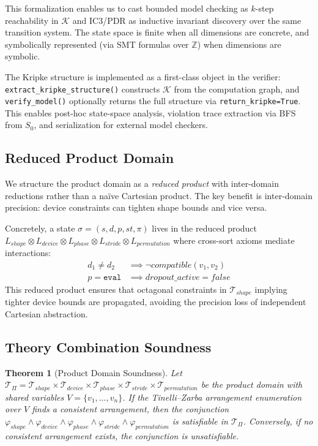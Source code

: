 \documentclass[11pt]{article}
\newtheorem{theorem}{Theorem}
\begin{document}
This formalization enables us to cast bounded model checking as
$k$-step reachability in $\mathcal{K}$ and IC3/PDR as inductive
invariant discovery over the same transition system.  The state
space is finite when all dimensions are concrete, and symbolically
represented (via SMT formulas over $\mathbb{Z}$) when dimensions
are symbolic.

The Kripke structure is implemented as a first-class object in the
verifier: \texttt{extract\_kripke\_structure()} constructs
$\mathcal{K}$ from the computation graph, and \texttt{verify\_model()}
optionally returns the full structure via \texttt{return\_kripke=True}.
This enables post-hoc state-space analysis, violation trace extraction
via BFS from $S_0$, and serialization for external model checkers.

\subsection{Reduced Product Domain}\label{sec:cofibered}

We structure the product domain
as a \emph{reduced product} with inter-domain reductions
rather than a na\"ive Cartesian
product.  The key benefit is inter-domain precision: device
constraints can tighten shape bounds and vice versa.

Concretely, a state $\sigma = (s, d, p, \mathit{st}, \pi)$ lives in the reduced
product $L_{\mathit{shape}} \otimes L_{\mathit{device}}
\otimes L_{\mathit{phase}} \otimes L_{\mathit{stride}}
\otimes L_{\mathit{permutation}}$ where cross-sort
axioms mediate interactions:
\begin{align}
  d_1 \neq d_2 &\implies \neg\mathit{compatible}(v_1, v_2)
    \label{ax:dev-shape} \\
  p = \texttt{eval} &\implies \mathit{dropout\_active} = \mathit{false}
    \label{ax:phase-drop}
\end{align}
This reduced product ensures that octagonal constraints
in $\mathcal{T}_{\mathit{shape}}$ implying tighter device bounds
are propagated, avoiding the precision loss of independent
Cartesian abstraction.

\subsection{Theory Combination Soundness}\label{sec:theory-combination}

\begin{theorem}[Product Domain Soundness]\label{thm:combination}
Let $\mathcal{T}_\Pi = \mathcal{T}_{\mathit{shape}} \times
\mathcal{T}_{\mathit{device}} \times \mathcal{T}_{\mathit{phase}}
\times \mathcal{T}_{\mathit{stride}} \times
\mathcal{T}_{\mathit{permutation}}$ be the product domain with
shared variables $V = \{v_1, \ldots, v_n\}$.  If the Tinelli--Zarba
arrangement enumeration over $V$ finds a consistent arrangement, then
the conjunction
$\varphi_{\mathit{shape}} \land \varphi_{\mathit{device}} \land
\varphi_{\mathit{phase}} \land \varphi_{\mathit{stride}} \land
\varphi_{\mathit{permutation}}$ is satisfiable in $\mathcal{T}_\Pi$.
Conversely, if no consistent arrangement exists, the conjunction is
unsatisfiable.
\end{theorem}
\end{document}
